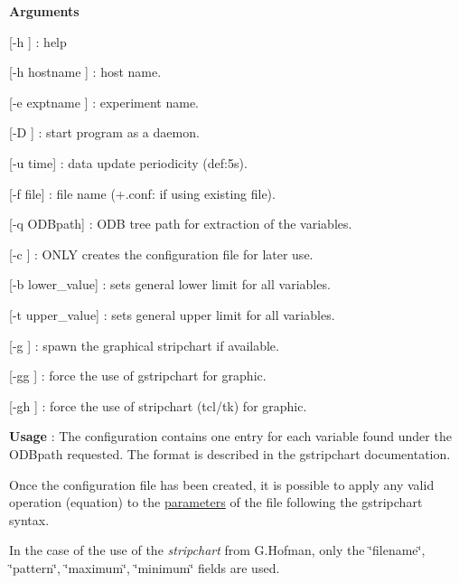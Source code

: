 \begin{DoxyItemize}
\item {\bfseries  Arguments }
\begin{DoxyItemize}
\item \mbox{[}-\/h \mbox{]} : help
\item \mbox{[}-\/h hostname \mbox{]} : host name.
\item \mbox{[}-\/e exptname \mbox{]} : experiment name.
\item \mbox{[}-\/D \mbox{]} : start program as a daemon.
\item \mbox{[}-\/u time\mbox{]} : data update periodicity (def:5s).
\item \mbox{[}-\/f file\mbox{]} : file name (+.conf: if using existing file).
\item \mbox{[}-\/q ODBpath\mbox{]} : ODB tree path for extraction of the variables.
\item \mbox{[}-\/c \mbox{]} : ONLY creates the configuration file for later use.
\item \mbox{[}-\/b lower\_\-value\mbox{]} : sets general lower limit for all variables.
\item \mbox{[}-\/t upper\_\-value\mbox{]} : sets general upper limit for all variables.
\item \mbox{[}-\/g \mbox{]} : spawn the graphical stripchart if available.
\item \mbox{[}-\/gg \mbox{]} : force the use of gstripchart for graphic.
\item \mbox{[}-\/gh \mbox{]} : force the use of stripchart (tcl/tk) for graphic.
\end{DoxyItemize}
\end{DoxyItemize}


\begin{DoxyItemize}
\item {\bfseries  Usage }: The configuration contains one entry for each variable found under the ODBpath requested. The format is described in the gstripchart documentation.
\end{DoxyItemize}

Once the configuration file has been created, it is possible to apply any valid operation (equation) to the \hyperlink{structparameters}{parameters} of the file following the gstripchart syntax.

In the case of the use of the {\itshape stripchart\/} from G.Hofman, only the \char`\"{}filename\char`\"{}, \char`\"{}pattern\char`\"{}, \char`\"{}maximum\char`\"{}, \char`\"{}minimum\char`\"{} fields are used.

